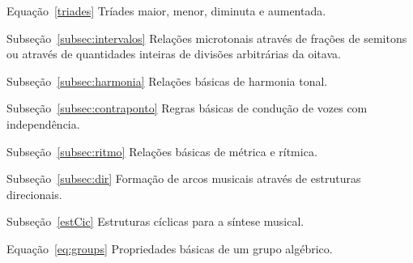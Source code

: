 \begin{listaespecial}[BIGNAMEWIDTH]
        \item[Equação~\ref{triades}] Tríades maior, menor, diminuta e aumentada.
        \item[Subseção~\ref{subsec:intervalos}] Relações microtonais através de frações de semitons ou através de quantidades inteiras de divisões arbitrárias da oitava.
        \item[Subseção~\ref{subsec:harmonia}] Relações básicas de harmonia tonal.
        \item[Subseção~\ref{subsec:contraponto}] Regras básicas de condução de vozes com independência.
        \item[Subseção~\ref{subsec:ritmo}] Relações básicas de métrica e rítmica.
        \item[Subseção~\ref{subsec:dir}] Formação de arcos musicais através de estruturas direcionais.
        \item[Subseção~\ref{estCic}] Estruturas cíclicas para a síntese musical.
        \item[Equação~\ref{eq:groups}] Propriedades básicas de um grupo algébrico.

	\end{listaespecial} 


